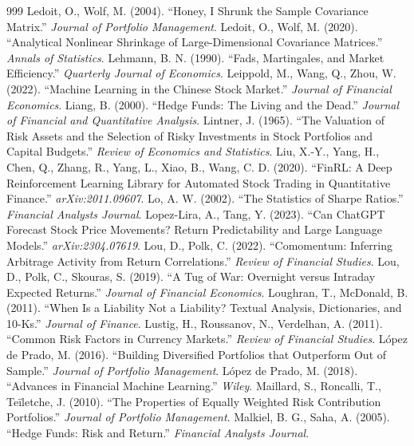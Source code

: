 \begin{thebibliography}{999}
 Ledoit, O., Wolf, M. (2004). ``Honey, I Shrunk the Sample Covariance Matrix.'' \textit{Journal of Portfolio Management}.
 Ledoit, O., Wolf, M. (2020). ``Analytical Nonlinear Shrinkage of Large-Dimensional Covariance Matrices.'' \textit{Annals of Statistics}.
 Lehmann, B. N. (1990). ``Fads, Martingales, and Market Efficiency.'' \textit{Quarterly Journal of Economics}.
 Leippold, M., Wang, Q., Zhou, W. (2022). ``Machine Learning in the Chinese Stock Market.'' \textit{Journal of Financial Economics}.
 Liang, B. (2000). ``Hedge Funds: The Living and the Dead.'' \textit{Journal of Financial and Quantitative Analysis}.
 Lintner, J. (1965). ``The Valuation of Risk Assets and the Selection of Risky Investments in Stock Portfolios and Capital Budgets.'' \textit{Review of Economics and Statistics}.
 Liu, X.-Y., Yang, H., Chen, Q., Zhang, R., Yang, L., Xiao, B., Wang, C. D. (2020). ``FinRL: A Deep Reinforcement Learning Library for Automated Stock Trading in Quantitative Finance.'' \textit{arXiv:2011.09607}.
 Lo, A. W. (2002). ``The Statistics of Sharpe Ratios.'' \textit{Financial Analysts Journal}.
 Lopez-Lira, A., Tang, Y. (2023). ``Can ChatGPT Forecast Stock Price Movements? Return Predictability and Large Language Models.'' \textit{arXiv:2304.07619}.
 Lou, D., Polk, C. (2022). ``Comomentum: Inferring Arbitrage Activity from Return Correlations.'' \textit{Review of Financial Studies}.
 Lou, D., Polk, C., Skouras, S. (2019). ``A Tug of War: Overnight versus Intraday Expected Returns.'' \textit{Journal of Financial Economics}.
 Loughran, T., McDonald, B. (2011). ``When Is a Liability Not a Liability? Textual Analysis, Dictionaries, and 10-Ks.'' \textit{Journal of Finance}.
 Lustig, H., Roussanov, N., Verdelhan, A. (2011). ``Common Risk Factors in Currency Markets.'' \textit{Review of Financial Studies}.
 López de Prado, M. (2016). ``Building Diversified Portfolios that Outperform Out of Sample.'' \textit{Journal of Portfolio Management}.
 López de Prado, M. (2018). ``Advances in Financial Machine Learning.'' \textit{Wiley}.
 Maillard, S., Roncalli, T., Teïletche, J. (2010). ``The Properties of Equally Weighted Risk Contribution Portfolios.'' \textit{Journal of Portfolio Management}.
 Malkiel, B. G., Saha, A. (2005). ``Hedge Funds: Risk and Return.'' \textit{Financial Analysts Journal}.

\end{thebibliography}
